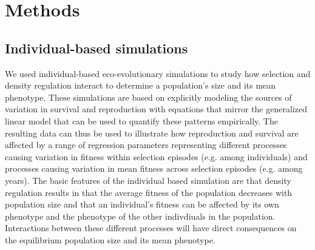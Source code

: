 \documentclass{article}
\begin{document}
\section{Methods}
\subsection{Individual-based simulations}

We used individual-based eco-evolutionary simulations to study how selection and density regulation interact to determine a population's size and its mean phenotype. These simulations are based on explicitly modeling the sources of variation in survival and reproduction with equations that mirror the generalized linear model that can be used to quantify these patterns empirically. The resulting data can thus be used to illustrate how reproduction and survival are affected by a range of regression parameters representing different processes causing variation in fitness within selection episodes (e.g. among individuals) and processes causing variation in mean fitness across selection episodes (e.g. among years). The basic features of the individual based simulation are that density regulation results in that the average fitness of the population decreases with population size and that an individual's fitness can be affected by its own phenotype and the phenotype of the other indivdiuals in the population. Interactions between these different processes will have direct consequences on the equilibrium population size and its mean phenotype. 
\end{document}
